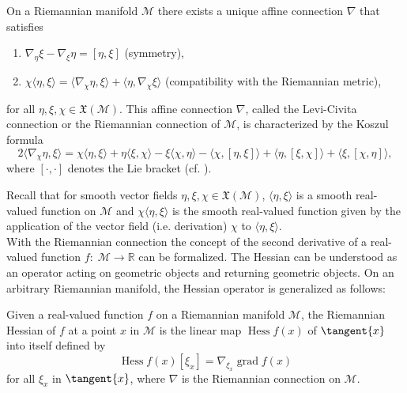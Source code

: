 \begin{theorem}\label{RiemannianConnection}
    On a Riemannian manifold $\mathcal{M}$ there exists a unique affine connection $\nabla$ that satisfies
    \begin{enumerate}
        \item $\nabla_{\eta} \xi - \nabla_{\xi} \eta = [\eta, \xi]$ (symmetry),
        \item $\chi \langle \eta, \xi \rangle = \langle \nabla_{\chi} \eta, \xi \rangle + \langle \eta, \nabla_{\chi} \xi \rangle$ (compatibility with the Riemannian metric),
    \end{enumerate}
    for all $\eta, \xi, \chi \in \mathfrak{X}(\mathcal{M})$. This affine connection $\nabla$, called the Levi-Civita connection or the Riemannian connection of $\mathcal{M}$, is characterized by the Koszul formula
    \begin{equation*}
        2 \langle \nabla_{\chi} \eta, \xi \rangle = \chi \langle \eta, \xi \rangle + \eta \langle \xi, \chi \rangle - \xi \langle \chi, \eta \rangle - \langle \chi, [\eta, \xi] \rangle + \langle \eta, [\xi, \chi] \rangle + \langle \xi, [\chi, \eta] \rangle,
    \end{equation*}
    where $[\cdot, \cdot]$ denotes the Lie bracket (cf. \cite[p.~96-97]{AbsilMahonySepulchre:2008}).
\end{theorem}

Recall that for smooth vector fields $\eta, \xi, \chi \in \mathfrak{X}(\mathcal{M})$, $\langle \eta, \xi \rangle$ is a smooth real-valued function on $\mathcal{M}$ and $\chi \langle \eta, \xi \rangle$ is the smooth real-valued function given by the application of the vector field (i.e. derivation) $\chi$ to $\langle \eta, \xi \rangle$. \\
With the Riemannian connection the concept of the second derivative of a real-valued function $f \colon \; \mathcal{M} \to \mathbb{R}$ can be formalized. The Hessian can be understood as an operator acting on geometric objects and returning geometric objects. On an arbitrary Riemannian manifold, the Hessian operator is generalized as follows: \newpage

\begin{definition}
    Given a real-valued function $f$ on a Riemannian manifold $\mathcal{M}$, the Riemannian Hessian of $f$ at a point $x$ in $\mathcal{M}$ is the linear map $\operatorname{Hess} f(x)$ of $\tangent{x}$ into itself defined by
    \begin{equation*}
        \operatorname{Hess} f(x) [\xi_x] = \nabla_{\xi_x} \operatorname{grad} f(x)
    \end{equation*}
    for all $\xi_x$ in $\tangent{x}$, where $\nabla$ is the Riemannian connection on $\mathcal{M}$.
\end{definition}

